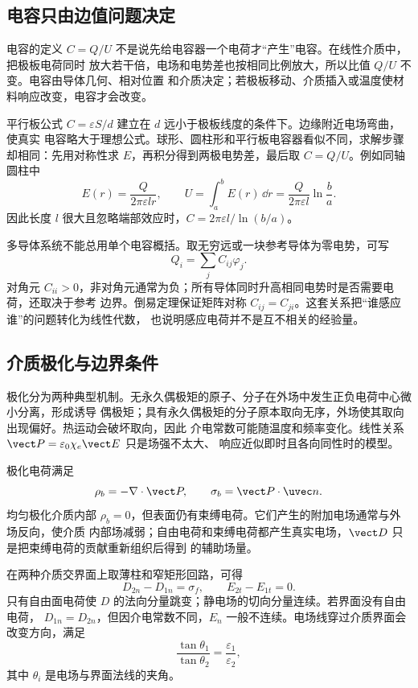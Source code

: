 \subsection*{电容只由边值问题决定}

电容的定义 $C=Q/U$ 不是说先给电容器一个电荷才“产生”电容。在线性介质中，把极板电荷同时
放大若干倍，电场和电势差也按相同比例放大，所以比值 $Q/U$ 不变。电容由导体几何、相对位置
和介质决定；若极板移动、介质插入或温度使材料响应改变，电容才会改变。

平行板公式 $C=\varepsilon S/d$ 建立在 $d$ 远小于极板线度的条件下。边缘附近电场弯曲，使真实
电容略大于理想公式。球形、圆柱形和平行板电容器看似不同，求解步骤却相同：先用对称性求
$E$，再积分得到两极电势差，最后取 $C=Q/U$。例如同轴圆柱中
\begin{equation}
 E(r)=\frac{Q}{2\pi\varepsilon l r},
 \qquad
 U=\int_a^bE(r)\,\dd r
 =\frac{Q}{2\pi\varepsilon l}\ln\frac ba.
\end{equation}
因此长度 $l$ 很大且忽略端部效应时，$C=2\pi\varepsilon l/\ln(b/a)$。

多导体系统不能总用单个电容概括。取无穷远或一块参考导体为零电势，可写
\begin{equation}
 Q_i=\sum_j C_{ij}\varphi_j.
\end{equation}
对角元 $C_{ii}>0$，非对角元通常为负；所有导体同时升高相同电势时是否需要电荷，还取决于参考
边界。倒易定理保证矩阵对称 $C_{ij}=C_{ji}$。这套关系把“谁感应谁”的问题转化为线性代数，
也说明感应电荷并不是互不相关的经验量。

\subsection*{介质极化与边界条件}

极化分为两种典型机制。无永久偶极矩的原子、分子在外场中发生正负电荷中心微小分离，形成诱导
偶极矩；具有永久偶极矩的分子原本取向无序，外场使其取向出现偏好。热运动会破坏取向，因此
介电常数可能随温度和频率变化。线性关系 $\vect P=\varepsilon_0\chi_e\vect E$ 只是场强不太大、
响应近似即时且各向同性时的模型。

极化电荷满足
\begin{equation}
 \rho_b=-\nabla\cdot\vect P,
 \qquad
 \sigma_b=\vect P\cdot\uvec n.
\end{equation}
均匀极化介质内部 $\rho_b=0$，但表面仍有束缚电荷。它们产生的附加电场通常与外场反向，使介质
内部场减弱；自由电荷和束缚电荷都产生真实电场，$\vect D$ 只是把束缚电荷的贡献重新组织后得到
的辅助场量。

在两种介质交界面上取薄柱和窄矩形回路，可得
\begin{equation}
 D_{2n}-D_{1n}=\sigma_f,
 \qquad
 E_{2t}-E_{1t}=0.
\end{equation}
只有自由面电荷使 $D$ 的法向分量跳变；静电场的切向分量连续。若界面没有自由电荷，
$D_{1n}=D_{2n}$，但因介电常数不同，$E_n$ 一般不连续。电场线穿过介质界面会改变方向，满足
\begin{equation}
 \frac{\tan\theta_1}{\tan\theta_2}=\frac{\varepsilon_1}{\varepsilon_2},
\end{equation}
其中 $\theta_i$ 是电场与界面法线的夹角。

